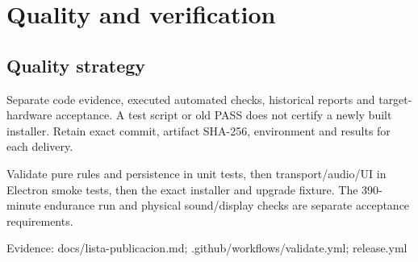 \section{Quality and verification}
\subsection{Quality strategy}

Separate code evidence, executed automated checks, historical reports and target-hardware acceptance. A test script or old PASS does not certify a newly built installer. Retain exact commit, artifact SHA-256, environment and results for each delivery.

Validate pure rules and persistence in unit tests, then transport/audio/UI in Electron smoke tests, then the exact installer and upgrade fixture. The 390-minute endurance run and physical sound/display checks are separate acceptance requirements.

Evidence: docs/lista-publicacion.md; .github/workflows/validate.yml; release.yml
